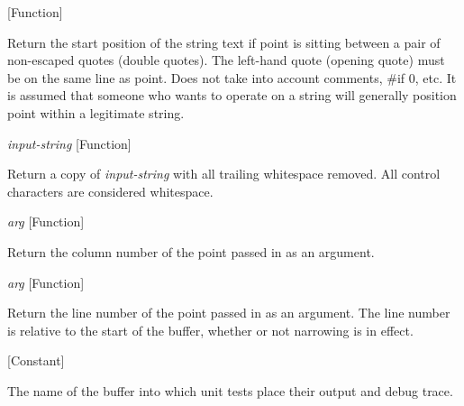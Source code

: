 \vspace{1em}
\noindent
{}
\usebox{\funcname}
 \hfill [Function]

\begin{doc-string}
Return the start position of the string text if point is sitting between a pair
of non-escaped quotes (double quotes).  The left-hand quote (opening quote) must be
on the same line as point.  Does not take into account comments, \#if 0, etc.  It is
assumed that someone who wants to operate on a string will generally position point
within a legitimate string.
\end{doc-string}

\vspace{1em}
\noindent
{}
\usebox{\funcname}\emph{input-string}
 \hfill [Function]

\begin{doc-string}
Return a copy of \emph{input-string} with all trailing whitespace removed.  All control
characters are considered whitespace.
\end{doc-string}

\vspace{1em}
\noindent
{}
\usebox{\funcname}\emph{arg}
 \hfill [Function]

\begin{doc-string}
Return the column number of the point passed in as an argument.
\end{doc-string}

\vspace{1em}
\noindent
{}
\usebox{\funcname}\emph{arg}
 \hfill [Function]

\begin{doc-string}
Return the line number of the point passed in as an argument.  The line number is
relative to the start of the buffer, whether or not narrowing is in effect.
\end{doc-string}

\vspace{1em}
\noindent
{}
\usebox{\funcname}
 \hfill [Constant]

\begin{doc-string}
The name of the buffer into which unit tests place their output and debug trace.
\end{doc-string}

